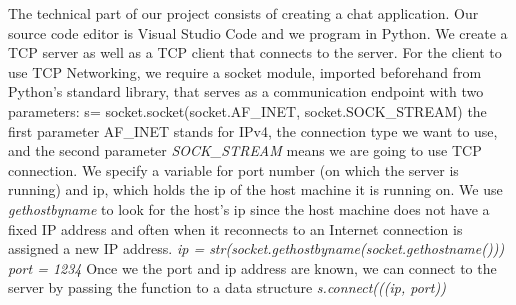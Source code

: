 The technical part of our project consists of creating a chat application. Our source code editor is Visual Studio Code and we program in Python. We create a TCP server as well as a TCP client that connects to the server. 
For the client to use TCP Networking, we require a socket module, imported beforehand from Python's standard library, that serves as a communication endpoint with two parameters:
s= socket.socket(socket.AF\_INET, socket.SOCK\_STREAM)
the first parameter AF\_INET stands for IPv4, the connection type we want to use, and the second parameter \textit{SOCK\_STREAM} means we are going to use TCP connection. We specify a variable for port number (on which the server is running) and ip, which holds the ip of the host machine it is running on. We use \textit{gethostbyname} to look for the host’s ip since the host machine does not have a fixed IP address and often when it reconnects to an Internet connection is assigned a new IP address.
\textit{ip = str(socket.gethostbyname(socket.gethostname()))}
\textit{port = 1234}
Once we the port and ip address are known, we can connect to the server by passing the function to a data structure \textit{s.connect(((ip, port))}

